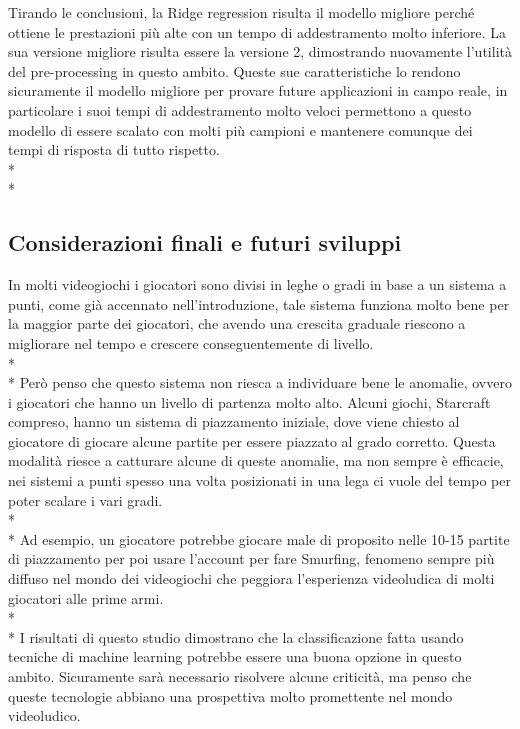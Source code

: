 Tirando le conclusioni, la Ridge regression risulta il modello migliore perché ottiene le prestazioni più alte con un tempo di addestramento molto inferiore. La sua versione migliore risulta essere la versione 2, dimostrando nuovamente l'utilità del pre-processing in questo ambito. Queste sue caratteristiche lo rendono sicuramente il modello migliore per provare future applicazioni in campo reale, in particolare i suoi tempi di addestramento molto veloci permettono a questo modello di essere scalato con molti più campioni e mantenere comunque dei tempi di risposta di tutto rispetto.\\*\\*
\subsection{Considerazioni finali e futuri sviluppi}\label{ssec:DecisionRes}
\normalsize
In molti videogiochi i giocatori sono divisi in leghe o gradi in base a un sistema a punti, come già accennato nell'introduzione, tale sistema funziona molto bene per la maggior parte dei giocatori, che avendo una crescita graduale riescono a migliorare nel tempo e crescere conseguentemente di livello.\\*\\*
Però penso che questo sistema non riesca a individuare bene le anomalie, ovvero i giocatori che hanno un livello di partenza molto alto. Alcuni giochi, Starcraft compreso, hanno un sistema di piazzamento iniziale, dove viene chiesto al giocatore di giocare alcune partite per essere piazzato al grado corretto. Questa modalità riesce a catturare alcune di queste anomalie, ma non sempre è efficacie, nei sistemi a punti spesso una volta posizionati in una lega ci vuole del tempo per poter scalare i vari gradi.\\*\\*
Ad esempio, un giocatore potrebbe giocare male di proposito nelle 10-15 partite di piazzamento per poi usare l'account per fare Smurfing, fenomeno sempre più diffuso nel mondo dei videogiochi che peggiora l'esperienza videoludica di molti giocatori alle prime armi.\\*\\*
I risultati di questo studio dimostrano che la classificazione fatta usando tecniche di machine learning potrebbe essere una buona opzione in questo ambito. Sicuramente sarà necessario risolvere alcune criticità, ma penso che queste tecnologie abbiano una prospettiva molto promettente nel mondo videoludico.